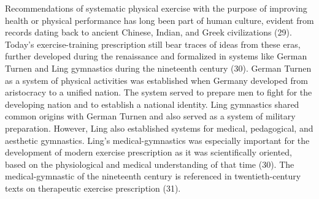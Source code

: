 \documentclass[twoside,10pt]{gihclass} %
\begin{document}
Recommendations of systematic physical exercise with the purpose of improving health or physical performance has long been part of human culture, evident from records dating back to ancient Chinese, Indian, and Greek civilizations
(29).
Today's exercise-training prescription still bear traces of ideas from these eras, further developed during the renaissance and formalized in systems like German Turnen and Ling gymnastics during the nineteenth century
(30).
German Turnen as a system of physical activities was established when Germany developed from aristocracy to a unified nation.
The system served to prepare men to fight for the developing nation and to establish a national identity.
Ling gymnastics shared common origins with German Turnen and also served as a system of military preparation.
However, Ling also established systems for medical, pedagogical, and aesthetic gymnastics.
Ling's medical-gymnastics was especially important for the development of modern exercise prescription as it was scientifically oriented, based on the physiological and medical understanding of that time (30).
The medical-gymnastic of the nineteenth century is referenced in twentieth-century texts on therapeutic exercise prescription
(31).
\end{document}
